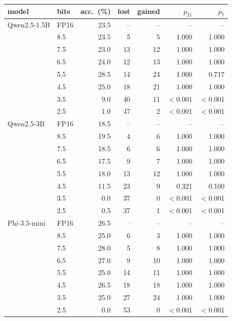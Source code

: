 \begin{tabular}{llrrrrr}
\toprule
model & bits & acc.\ (\%) & lost & gained & $p_{21}$ & $p_{7}$ \\
\midrule
Qwen2.5-1.5B & FP16 & 23.5 & -- & -- & -- & -- \\
 & 8.5 & 23.5 & 5 & 5 & 1.000 & 1.000 \\
 & 7.5 & 23.0 & 13 & 12 & 1.000 & 1.000 \\
 & 6.5 & 24.0 & 12 & 13 & 1.000 & 1.000 \\
 & 5.5 & 28.5 & 14 & 24 & 1.000 & 0.717 \\
 & 4.5 & 25.0 & 18 & 21 & 1.000 & 1.000 \\
 & 3.5 & 9.0 & 40 & 11 & $<$0.001 & $<$0.001 \\
 & 2.5 & 1.0 & 47 & 2 & $<$0.001 & $<$0.001 \\
\addlinespace
Qwen2.5-3B & FP16 & 18.5 & -- & -- & -- & -- \\
 & 8.5 & 19.5 & 4 & 6 & 1.000 & 1.000 \\
 & 7.5 & 18.5 & 6 & 6 & 1.000 & 1.000 \\
 & 6.5 & 17.5 & 9 & 7 & 1.000 & 1.000 \\
 & 5.5 & 18.0 & 13 & 12 & 1.000 & 1.000 \\
 & 4.5 & 11.5 & 23 & 9 & 0.321 & 0.100 \\
 & 3.5 & 0.0 & 37 & 0 & $<$0.001 & $<$0.001 \\
 & 2.5 & 0.5 & 37 & 1 & $<$0.001 & $<$0.001 \\
\addlinespace
Phi-3.5-mini & FP16 & 26.5 & -- & -- & -- & -- \\
 & 8.5 & 25.0 & 6 & 3 & 1.000 & 1.000 \\
 & 7.5 & 28.0 & 5 & 8 & 1.000 & 1.000 \\
 & 6.5 & 27.0 & 9 & 10 & 1.000 & 1.000 \\
 & 5.5 & 25.0 & 14 & 11 & 1.000 & 1.000 \\
 & 4.5 & 26.5 & 18 & 18 & 1.000 & 1.000 \\
 & 3.5 & 25.0 & 27 & 24 & 1.000 & 1.000 \\
 & 2.5 & 0.0 & 53 & 0 & $<$0.001 & $<$0.001 \\
\bottomrule
\end{tabular}

